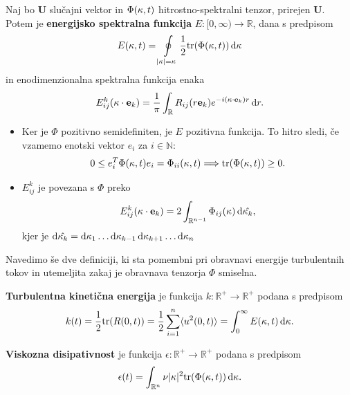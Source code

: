 \documentclass[mat2, tisk]{fmfdelo}
\newcommand{\R}{\mathbb R}
\newcommand{\N}{\mathbb N}
\newcommand{\bd}{\textbf}
\begin{document}
\begin{definicija}
Naj bo $\bd{U}$ slučajni vektor in $\Phi(\text{\bd{$\kappa$}}, t)$ 
hitrostno-spektralni tenzor, prirejen $\bd{U}$. Potem je \bd{energijsko spektralna funkcija} $E: [0, \infty) \rightarrow \R$, dana
s predpisom
\begin{equation}
E(\kappa, t) = \oint\limits_{|\text{\bd{$\kappa$}}| = \kappa} \frac{1}{2} \text{tr}(\Phi(\text{\bd{$\kappa$}}, t)) \dif \text{\bd{$\kappa$}}
\end{equation}
in enodimenzionalna spektralna funkcija enaka 
\begin{equation}
E_{ij}^k (\bd{\text{$\kappa$}} \cdot \bd{e}_k) = \frac{1}{\pi} \int_\R R_{ij}(r\bd{e}_k) e^{-i(\bd{\text{$\kappa$}} \cdot \bd{e}_k)r} \dif r.
\end{equation}
\end{definicija}

\begin{opomba}
  \hfill
\begin{itemize}
\item Ker je $\Phi$ pozitivno semidefiniten, je $E$ pozitivna funkcija. To hitro sledi, če vzamemo 
enotski vektor $e_i$ za $i\in \N$:
$$
0 \leq e^T_i \Phi(\text{\bd{$\kappa$}}, t) e_i = \Phi_{ii}(\text{\bd{$\kappa$}}, t) \Longrightarrow \text{tr}(\Phi(\text{\bd{$\kappa$}}, t)) \geq 0.
$$
\item $E_{ij}^k$ je povezana s $\Phi$ preko 
$$
E^k_{ij}(\bd{\text{$\kappa$}} \cdot \bd{e}_k) = 2 \int_{\R^{n-1}} \Phi_{ij}(\bd{\text{$\kappa$}}) \dif \hat{\bd{\text{$\kappa$}}_k},
$$
kjer je $ \dif \hat{\bd{\text{$\kappa$}}_k} = \dif \kappa_1 \dots \dif \kappa_{k-1} \dif \kappa_{k+1} \dots \dif \kappa_{n}$
\end{itemize}
\end{opomba}

Navedimo še dve definiciji, ki sta pomembni pri obravnavi energije 
turbulentnih tokov in utemeljita zakaj je obravnava tenzorja $\Phi$ smiselna.

\begin{definicija}
\textbf{Turbulentna kinetična energija} je funkcija $k:\R^+ \rightarrow \R^+$ podana s predpisom
\begin{equation}
k(t) = \frac{1}{2} \text{tr}(R(0, t)) = \frac{1}{2} \sum_{i=1}^{n} \langle u^2(0, t) \rangle = \int_{0}^\infty E(\kappa, t) \dif \kappa.
\end{equation}
\end{definicija}

\begin{definicija}
\bd{Viskozna disipativnost} je funkcija $\epsilon: \R^+ \rightarrow \R^+$ podana s predpisom
\begin{equation}
\epsilon(t) = \int_{\R^n} \nu |\bd{\text{$\kappa$}}|^2 \text{tr}(\Phi(\bd{\text{$\kappa$}}, t)) \dif \bd{\text{$\kappa$}}.
\end{equation}
\end{definicija}
\end{document}
